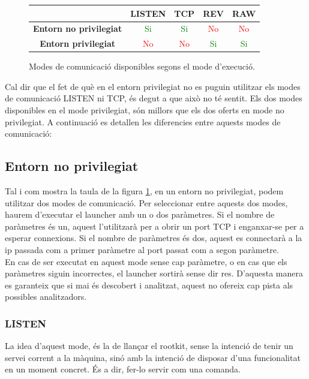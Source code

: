 \begin{figure}[htp]
    \centering
    \begin{tabular}{|c|c|c|c|c|}
        \hline
         & \textbf{LISTEN} & \textbf{TCP} & \textbf{REV} & \textbf{RAW} \\ \hline
         \textbf{Entorn no privilegiat} & \textcolor{Green}{Si} & \textcolor{Green}{Si} & \textcolor{Red}{No} & \textcolor{Red}{No} \\ \hline
         \textbf{Entorn privilegiat} & \textcolor{Red}{No} & \textcolor{Red}{No} & \textcolor{Green}{Si} & \textcolor{Green}{Si} \\ \hline
    \end{tabular}
    \caption{Modes de comunicació disponibles segons el mode d'execució.}
    \label{fig:tableModesRelation}
\end{figure}

Cal dir que el fet de què en el entorn privilegiat no es puguin utilitzar els modes de comunicació LISTEN ni TCP, és degut
a que això no té sentit. Els dos modes disponibles en el mode privilegiat, són millors que els dos oferts en mode no
privilegiat. A continuació es detallen les diferencies entre aquests modes de comunicació:

\subsection{Entorn no privilegiat}

Tal i com mostra la taula de la figura \ref{fig:tableModesRelation}, en un entorn no privilegiat, podem utilitzar dos modes de
comunicació. Per seleccionar entre aquests dos modes, haurem d'executar el launcher amb un o dos paràmetres. Si el nombre de
paràmetres és un, aquest l'utilitzarà per a obrir un port TCP i enganxar-se per a esperar connexions. Si el nombre de paràmetres
és dos, aquest es connectarà a la ip passada com a primer paràmetre al port passat com a segon paràmetre. \\

En cas de ser executat en aquest mode sense cap paràmetre, o en cas que els paràmetres siguin incorrectes, el launcher sortirà
sense dir res. D'aquesta manera es garanteix que si mai és descobert i analitzat, aquest no ofereix cap pista als possibles analitzadors. \\

\subsubsection{LISTEN}
La idea d'aquest mode, és la de llançar el rootkit, sense la intenció de tenir un servei corrent
a la màquina, sinó amb la intenció de disposar d'una funcionalitat en un moment concret. És a dir, fer-lo servir
com una comanda.\\


